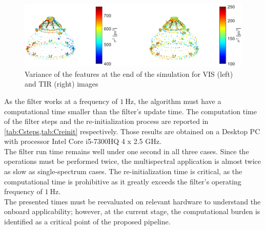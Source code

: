 \begin{figure}[!h]
    \centering
    \includegraphics[clip,trim = 2cm 0cm 1cm 0cm,width=\linewidth]{Images/colors2.eps}
    \caption[Variance of the features at the end of the simulation]{Variance of the features at the end of the simulation for VIS (left) and TIR (right) images}
    \label{fig:colors}
\end{figure}
As the filter works at a frequency of $\SI{1}{\hertz}$, the algorithm must have a computational time smaller than the filter's update time. The computation time of the filter steps and the re-initialization process are reported in \cref{tab:Csteps,tab:Creinit} respectively. Those results are obtained on a Desktop PC with processor Intel Core i5-7300HQ 4 x 2.5 GHz.\\
The filter run time remains well under one second in all three cases. Since the operations must be performed twice, the multispectral application is almost twice as slow as single-spectrum cases. The re-initialization time is critical, as the computational time is prohibitive as it greatly exceeds the filter's operating frequency of $\SI{1}{\hertz}$. \\
The presented times must be reevaluated on relevant hardware to understand the onboard applicability; however, at the current stage, the computational burden is identified as a critical point of the proposed pipeline.
